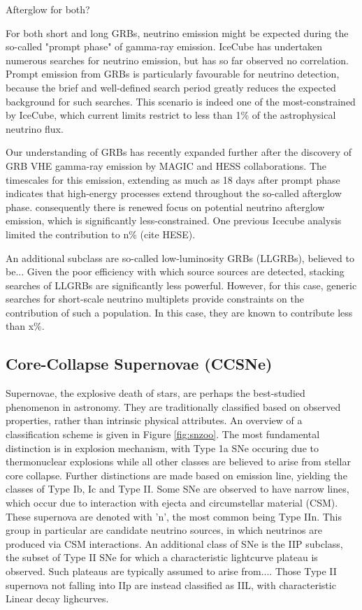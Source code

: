 \documentclass[]{article}
\begin{document}
Afterglow for both?

For both short and long GRBs, neutrino emission might be expected during the so-called "prompt phase" of gamma-ray emission. IceCube has undertaken numerous searches for neutrino emission, but has so far observed no correlation. Prompt emission from GRBs is particularly favourable for neutrino detection, because the brief and well-defined search period greatly reduces the expected background for such searches. This scenario is indeed one of the most-constrained by IceCube, which current limits restrict to less than 1\% of the astrophysical neutrino flux. 

Our understanding of GRBs has recently expanded further after the discovery of GRB VHE gamma-ray emission by MAGIC and HESS collaborations. The timescales for this emission, extending as much as 18 days after prompt phase indicates that high-energy processes extend throughout the so-called afterglow phase. consequently there is renewed focus on potential neutrino afterglow  emission, which is significantly less-constrained. One previous Icecube analysis limited the contribution to n\% (cite HESE).

An additional subclass are so-called low-luminosity GRBs (LLGRBs), believed to be... Given the poor efficiency with which source sources are detected, stacking searches of LLGRBs are significantly less powerful. However, for this case, generic searches for short-scale neutrino multiplets provide constraints on the contribution of such a population. In this case, they are known to contribute less than x\%.
\subsection{Core-Collapse Supernovae (CCSNe)}
Supernovae, the explosive death of stars, are perhaps the best-studied phenomenon in astronomy. They are traditionally classified based on observed properties, rather than intrinsic physical attributes. An overview of a classification scheme is given in Figure \ref{fig:snzoo}. The most fundamental distinction is in explosion mechanism, with Type 1a SNe occuring due to thermonuclear explosions while all other classes are believed to arise from stellar core collapse. Further distinctions are made based on emission line, yielding the classes of Type Ib, Ic and Type II. Some SNe are observed to have narrow lines, which occur due to interaction with ejecta and circumstellar material (CSM). These supernova are denoted with 'n', the most common being Type IIn. This group in particular are candidate neutrino sources, in which neutrinos are produced via CSM interactions. An additional class of SNe is the IIP subclass, the subset of Type II SNe for which a characteristic lightcurve plateau is observed. Such plateaus are typically assumed to arise from....
Those Type II supernova not falling into IIp are instead classified as IIL, with characteristic Linear decay lighcurves.
\end{document}
